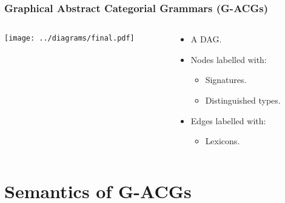\documentclass{beamer}
\begin{document}
\begin{frame}
  \frametitle{Graphical Abstract Categorial Grammars (G-ACGs)}

  \begin{columns}[c]
    \begin{column}{0.6\textwidth}
      \begin{center}
        \texttt{[image: ../diagrams/final.pdf]}
      \end{center}
    \end{column}

    \pause

    \begin{column}{0.4\textwidth}
        \begin{itemize}
        \item A DAG.
        \item Nodes labelled with:
          \begin{itemize}
          \item Signatures.
          \item Distinguished types.
          \end{itemize}
        \item Edges labelled with:
          \begin{itemize}
          \item Lexicons.
          \end{itemize}
        \end{itemize}
    \end{column}
  \end{columns}
\end{frame}


\section{Semantics of G-ACGs}
\end{document}
